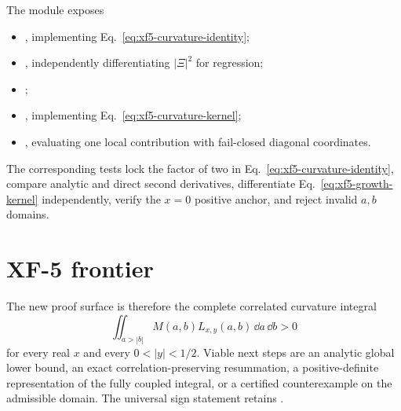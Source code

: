 The module  exposes
\begin{itemize}
\item {}, implementing Eq.~\eqref{eq:xf5-curvature-identity};
\item {}, independently differentiating $|\Xi|^2$ for regression;
\item {};
\item {}, implementing Eq.~\eqref{eq:xf5-curvature-kernel};
\item {}, evaluating one local contribution with fail-closed diagonal coordinates.
\end{itemize}

The corresponding tests lock the factor of two in Eq.~\eqref{eq:xf5-curvature-identity}, compare analytic and direct second derivatives, differentiate Eq.~\eqref{eq:xf5-growth-kernel} independently, verify the $x=0$ positive anchor, and reject invalid $a,b$ domains.

\section{XF-5 frontier}

The new proof surface is therefore the complete correlated curvature integral
\begin{equation}\label{eq:xf5-final-frontier}
\boxed{
\iint_{a>|b|}
M(a,b)L_{x,y}(a,b)\,\dd a\,\dd b>0
}
\end{equation}
for every real $x$ and every $0<|y|<1/2$.  Viable next steps are an analytic global lower bound, an exact correlation-preserving resummation, a positive-definite representation of the fully coupled integral, or a certified counterexample on the admissible domain.  The universal sign statement retains .
